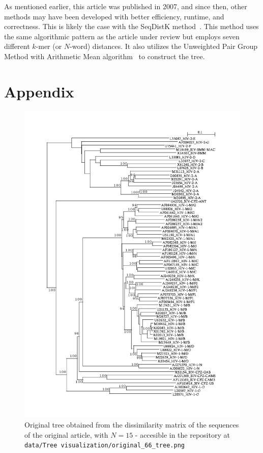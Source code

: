 \documentclass[english,13pt,a4paper]{article}
\theoremstyle{definition}
\theoremstyle{remark}
\theoremstyle{defstyle}
\begin{document}
As mentioned earlier, this article was published in 2007, and since then, other methods may have been developed with better efficiency, runtime, and correctness. This is likely the case with the SeqDistK method~\cite{Liu2021seqdistk}. This method uses the same algorithmic pattern as the article under review but employs seven different $k$-mer (or $N$-word) distances. It also utilizes the Unweighted Pair Group Method with Arithmetic Mean algorithm~\cite{sokal1975statistical} to construct the tree.


\vfill

\printbibliography

\section*{Appendix}

\begin{figure}[H]
    \centering
    \includegraphics[width=\textwidth]{../data/Tree visualization/original_66_tree.png}
    \caption{Original tree obtained from the dissimilarity matrix of the sequences of the original article, with $N = 15$ - accesible in the repository at \texttt{data/Tree  visualization/original\_66\_tree.png}}
    \label{fig:original_tree66}
\end{figure}
\end{document}
